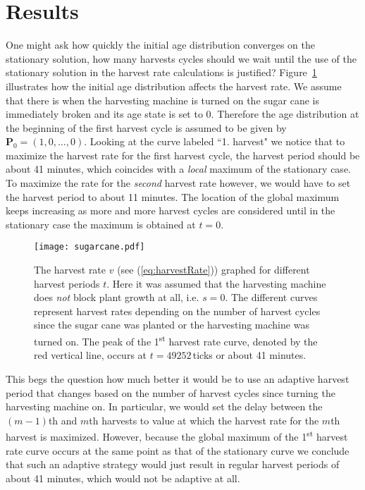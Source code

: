 	\section{Results}
	One might ask how quickly the initial age distribution converges on the stationary
	solution, how many harvests cycles should we wait until the use of the stationary
	solution in the harvest rate calculations is justified?
	Figure~\ref{fig:harvestRateDistributionComparison} illustrates how the initial age
	distribution affects the harvest rate. We assume that there is when the harvesting
	machine is turned on the sugar cane is immediately broken and its age state is set to
	0. Therefore the age distribution at the beginning of the first harvest cycle is
	assumed to be given by $\mathbf{P}_0 = (1,0,\ldots,0)$. Looking at the curve labeled
	``1. harvest" we notice that to maximize the
	harvest rate for the first harvest cycle, the harvest period should be about 41
	minutes, which coincides with a \emph{local} maximum of the stationary case. To
	maximize the rate for the \emph{second} harvest rate however, we would have to set the
	harvest period to about 11 minutes. The location of the global maximum keeps
	increasing as more and more harvest cycles are considered until in the stationary case
	the maximum is obtained at $t=0$.
	\begin{figure}[h!]
		\centering
		\texttt{[image: sugarcane.pdf]}
		\caption{The harvest rate $v$ (see (\ref{eq:harvestRate})) graphed for different
		harvest periods $t$. Here it was assumed that the harvesting machine does
		\emph{not} block plant growth at all, i.e. $s=0$. The different curves represent
		harvest rates depending on the number of harvest cycles since the sugar cane was
		planted or the harvesting machine was turned on. The peak of the
		1\textsuperscript{st} harvest rate curve, denoted by the red vertical line, occurs
		at $t=49252\,$ticks or about 41 minutes.}
		\label{fig:harvestRateDistributionComparison}
	\end{figure}

	This begs the question how much better it would be to use an adaptive harvest period
	that changes based on the number of harvest cycles since turning the harvesting
	machine on. In particular, we would set the delay between the $(m-1)$th and $m$th
	harvests to value at which the harvest rate for the $m$th harvest is maximized.
	However, because the global maximum of the 1\textsuperscript{st} harvest rate curve
	occurs at the same point as that of the stationary curve we conclude that such an
	adaptive strategy would just result in regular harvest periods of about 41 minutes,
	which would not be adaptive at all.

